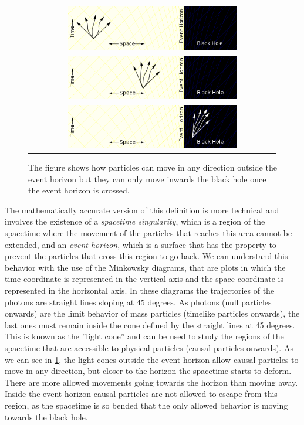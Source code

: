 \begin{figure}[b!]
\centering
\begin{tabular}{c}
\includegraphics[width=0.7\textwidth]{img/Introd/1.png}\\
\includegraphics[width=0.7\textwidth]{img/Introd/2.png}\\
\includegraphics[width=0.7\textwidth]{img/Introd/3.png}
\end{tabular}
\caption{The figure shows how particles can move in any direction outside the event horizon but they can only move inwards the black hole once the event horizon is crossed.}
\label{blackholecones}
\end{figure}
The mathematically accurate version of this definition is more technical and involves the existence of a \textit{spacetime singularity}, which is a region of the spacetime where the movement of the particles that reaches this area cannot be extended, and an \textit{event horizon}, which is a surface that has the property to prevent the particles that cross this region to go back. We can understand this behavior with the use of the Minkowsky diagrams, that are plots in which the time coordinate is represented in the vertical axis and the space coordinate is represented in the horizontal axis. In these diagrams the trajectories of the photons are straight lines sloping at 45 degrees. As photons (null particles onwards) are the limit behavior of mass particles (timelike particles onwards), the last ones must remain inside the cone defined by the straight lines at 45 degrees. This is known as the ''light cone'' and can be used to study the regions of the spacetime that are accessible to physical particles (causal particles onwards). As we can see in \cref{blackholecones}, the light cones outside the event horizon allow causal particles to move in any direction, but closer to the horizon the spacetime starts to deform. There are more allowed movements going towards the horizon than moving away. Inside the event horizon causal particles are not allowed to escape from this region, as the spacetime is so bended that the only allowed behavior is moving towards the black hole. 

